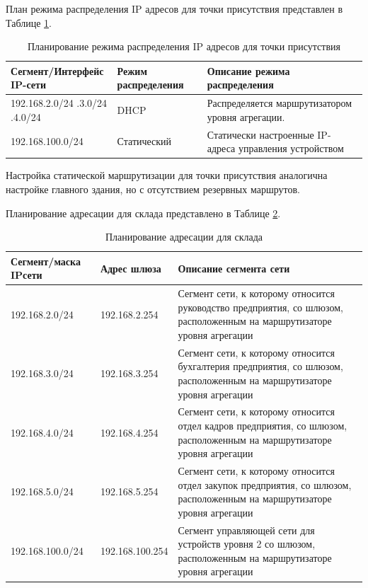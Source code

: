 \documentclass[14pt, a4paper]{extarticle}
\numberwithin{equation}{section}
\begin{document}
\newpage
План режима распределения IP адресов для точки присутствия представлен в Таблице \ref{table:tpDistributionPlan}.

\begin{table}[H]
\centering
\small
\caption{Планирование режима распределения IP адресов для точки присутствия}
\label{table:tpDistributionPlan}
\begin{tabular}{|p{4cm}|p{3cm}|p{8cm}|}
\hline
\textbf{Сегмент/Интерфейс IP-сети } & \textbf{Режим распределения} & \textbf{Описание режима распределения} 
\\ \hline
192.168.2.0/24 \newline
192.168.3.0/24 \newline
192.168.4.0/24 \newline
&
DHCP
&
Распределяется маршрутизатором уровня агрегации. 
\\ \hline
192.168.100.0/24 & Статический & Статически настроенные IP-адреса управления устройством 
\\ \hline
\end{tabular}
\end{table}

Настройка статической маршрутизации для точки присутствия аналогична настройке главного здания, но с отсутствием резервных маршрутов.



Планирование адресации для склада представлено в Таблице \ref{table:warehouseIpPlan}.
\begin{table}[H]
\centering
\small
\caption{Планирование адресации для склада}
\label{table:warehouseIpPlan}
\begin{tabular}{|m{4cm}|m{3cm}|m{8cm}|}
\hline
\textbf{Сегмент/маска IPсети} & \textbf{Адрес шлюза} & \textbf{Описание сегмента сети} \\
\hline
192.168.2.0/24 & 192.168.2.254 & Сегмент сети, к которому относится руководство предприятия, со шлюзом, расположенным на маршрутизаторе уровня агрегации
\\ \hline
192.168.3.0/24 & 192.168.3.254 & Сегмент сети, к которому относится бухгалтерия предприятия, со шлюзом, расположенным на маршрутизаторе уровня агрегации
\\ \hline
192.168.4.0/24 & 192.168.4.254 & Сегмент сети, к которому относится отдел кадров предприятия, со шлюзом, расположенным на маршрутизаторе уровня агрегации
\\ \hline
192.168.5.0/24 & 192.168.5.254 & Сегмент сети, к которому относится отдел закупок предприятия, со шлюзом, расположенным на маршрутизаторе уровня агрегации
\\ \hline
192.168.100.0/24 & 192.168.100.254 & Сегмент управляющей сети для устройств уровня 2 со шлюзом, расположенным на маршрутизаторе уровня агрегации 
\\ \hline
\end{tabular}
\end{table}
\end{document}
